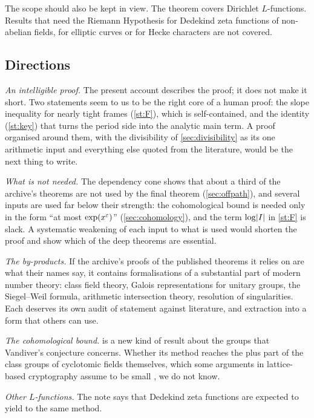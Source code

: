 The scope should also be kept in view. The theorem covers Dirichlet $L$-functions. Results
that need the Riemann Hypothesis for Dedekind zeta functions of non-abelian fields, for
elliptic curves or for Hecke characters are not covered.

\subsection{Directions}
\emph{An intelligible proof.} The present account describes the proof; it does not make it
short. Two statements seem to us to be the right core of a human proof: the slope inequality
for nearly tight frames (\cref{st:F}), which is self-contained, and the identity
(\cref{st:key}) that turns the period side into the analytic main term. A proof organised
around them, with the divisibility of \cref{sec:divisibility} as its one arithmetic input and
everything else quoted from the literature, would be the next thing to write.

\emph{What is not needed.} The dependency cone shows that about a third of the archive's
theorems are not used by the final theorem (\cref{sec:offpath}), and several inputs are used far below their
strength: the cohomological bound is needed only in the form ``at most $\exp(x^\varepsilon)$''
(\cref{sec:cohomology}), and the term $\log\lvert I\rvert$ in \cref{st:F} is slack. A systematic
weakening of each input to what is used would shorten the proof and show which of the deep
theorems are essential.

\emph{The by-products.} If the archive's proofs of the published theorems it relies on are what
their names say, it contains formalisations of a substantial part of modern number theory:
class field theory, Galois representations for unitary groups, the Siegel--Weil formula,
arithmetic intersection theory, resolution of singularities. Each deserves its own audit of
statement against literature, and extraction into a form that others can use.

\emph{The cohomological bound.}  is a new kind of result about the groups that
Vandiver's conjecture concerns. Whether its method reaches the plus part of the class groups of
cyclotomic fields themselves, which some arguments in lattice-based cryptography assume to be
small \cite{cdpr2016}, we do not know.

\emph{Other $L$-functions.} The note says that Dedekind zeta functions are expected to yield to
the same method.
